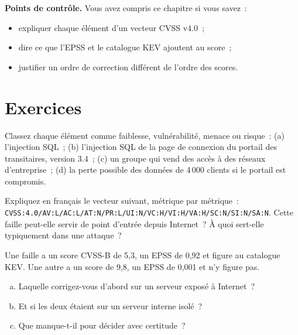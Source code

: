 \begin{boxinfo}
\textbf{Points de contrôle.} Vous avez compris ce chapitre si vous savez~:
\begin{itemize}
    \item expliquer chaque élément d'un vecteur CVSS v4.0~;
    \item dire ce que l'EPSS et le catalogue KEV ajoutent au score~;
    \item justifier un ordre de correction différent de l'ordre des scores.
\end{itemize}
\end{boxinfo}

\section*{Exercices}

\begin{boxexo}[title={\ding{45}\quad Exercice~9.1. Faiblesse ou vulnérabilité \niveaubase}]
Classez chaque élément comme faiblesse, vulnérabilité, menace ou risque~:
(a) l'injection SQL~; (b) l'injection SQL de la page de connexion du portail
des transitaires, version 3.4~; (c) un groupe qui vend des accès à des
réseaux d'entreprise~; (d) la perte possible des données de 4\,000 clients
si le portail est compromis.
\end{boxexo}

\begin{boxexo}[title={\ding{45}\quad Exercice~9.2. Lire un vecteur \niveaumoyen}]
Expliquez en français le vecteur suivant, métrique par métrique~:
\texttt{CVSS:4.0/AV:L/AC:L/AT:N/PR:L/UI:N/VC:H/VI:H/VA:H/SC:N/SI:N/SA:N}.
Cette faille peut-elle servir de point d'entrée depuis Internet~? À quoi
sert-elle typiquement dans une attaque~?
\end{boxexo}

\begin{boxexo}[title={\ding{45}\quad Exercice~9.3. Trois indicateurs \niveaumoyen}]
Une faille a un score CVSS-B de 5,3, un EPSS de 0,92 et figure au catalogue
KEV. Une autre a un score de 9,8, un EPSS de 0,001 et n'y figure pas.
\begin{enumerate}[(a)]
    \item Laquelle corrigez-vous d'abord sur un serveur exposé à Internet~?
    \item Et si les deux étaient sur un serveur interne isolé~?
    \item Que manque-t-il pour décider avec certitude~?
\end{enumerate}
\end{boxexo}

